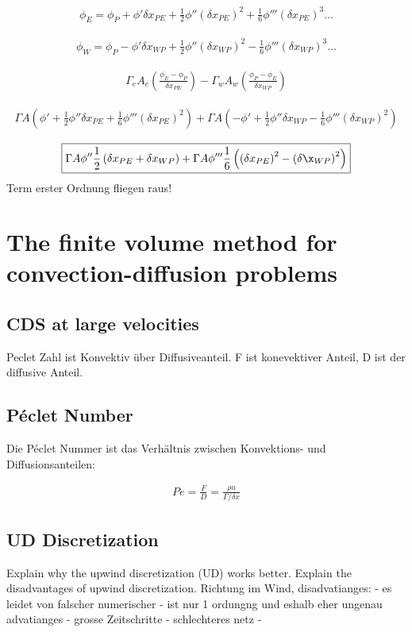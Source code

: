\documentclass[a4paper]{scrartcl}
\begin{document}
\begin{align}
\boxed{\phi_E=\phi_P+\phi'\delta x_{PE} + \frac{1}{2}\phi''\left(\delta
x_{PE}\right)^2+\frac{1}{6}\phi'''\left(\delta x_{PE}\right)^3\ldots}
\end{align}

\begin{align}
\boxed{\phi_W=\phi_P-\phi'\delta x_{WP} + \frac{1}{2}\phi''\left(\delta
x_{WP}\right)^2-\frac{1}{6}\phi'''\left(\delta x_{WP}\right)^3\ldots}
\end{align}

\begin{align}
\Gamma_e A_e \left(\frac{\phi_E-\phi_P}{\delta x_{PE}}\right)-\Gamma_w A_w
\left(\frac{\phi_P-\phi_E}{\delta x_{WP}}\right)
\end{align}

\begin{align}
\Gamma A \left(\phi' + \frac{1}{2} \phi''\delta
x_{PE}+\frac{1}{6}\phi'''\left(\delta x_{PE}\right)^2\right) + \Gamma A
\left(-\phi'+\frac{1}{2}\phi''\delta x_{WP} - \frac{1}{6} \phi'''
\left(\delta x_{WP}\right)^2\right)
\end{align}

\begin{align}
\boxed{\Gamma A \phi'' \frac{1}{2} \left(\delta x_{PE} + \delta x_{WP}\right)+
\Gamma A \phi''' \frac{1}{6} \left(\left(\delta x_{PE}\right)^2-\left(\delta
\x_{WP}\right)^2\right)}
\end{align}
Term erster Ordnung fliegen raus!
\section{The finite volume method for convection-diffusion problems}
\subsection{CDS at large velocities}
Peclet Zahl ist Konvektiv über Diffusiveanteil. F ist konevektiver Anteil, D
ist der diffusive Anteil.
\subsection{Péclet Number}
Die Péclet Nummer ist das Verhältnis zwischen Konvektions- und
Diffusionsanteilen:

\begin{align}
Pe=\frac{F}{D} = \frac{\rho u}{\Gamma / \delta x}
\end{align}
\subsection{UD Discretization}
Explain why the upwind discretization (UD) works better. Explain the disadvantages of upwind discretization.
Richtung im Wind, 
disadvatianges:
- es leidet von falscher numerischer
- ist nur 1 ordungng und eshalb eher ungenau
advatianges
- grosse Zeitschritte
- schlechteres netz
- 
\end{document}
